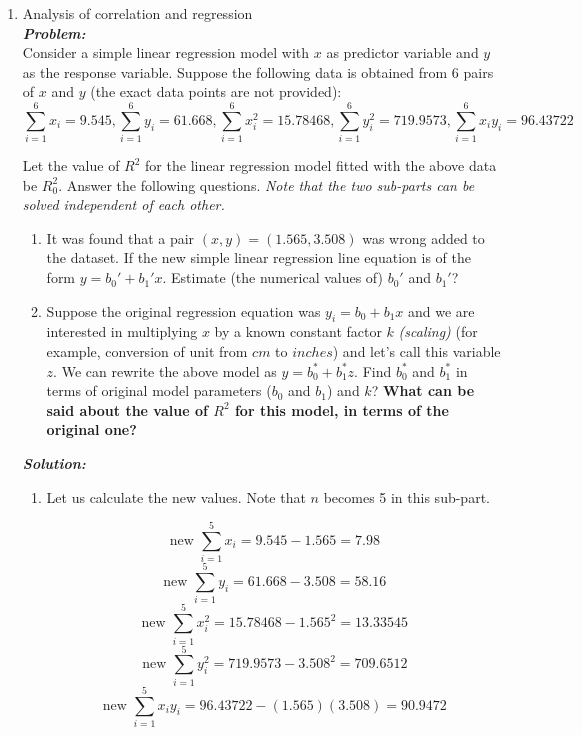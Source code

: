 \documentclass[12pt, oneside]{article}
\begin{document}
\begin{enumerate}
\begin{enumerate}
\end{enumerate}


\item	Analysis of correlation and regression  \\
\textit{\textbf{Problem:}} \\

Consider a simple linear regression model with $x$ as predictor variable and $y$ as the response variable. Suppose the following data is obtained from 6 pairs of $x$ and $y$ (the exact data points are not provided):
\[ \sum_{i=1}^{6} x_i = 9.545,
\sum_{i=1}^{6} y_i = 61.668,
\sum_{i=1}^{6} x_i^2 = 15.78468,
\sum_{i=1}^{6} y_i^2 = 719.9573,
\sum_{i=1}^{6} x_i y_i = 96.43722
\]

Let the value of $R^2$ for the linear regression model fitted with the above data be $R_0^2$. Answer the following questions. \textit{Note that the two sub-parts can be solved independent of each other.}

\begin{enumerate}
    \item It was found that a pair $(x,y) = (1.565,3.508)$ was wrong added to the dataset. If the new simple linear regression line equation is of the form $y = b_0' + b_1' x$. Estimate (the numerical values of) $b_0'$ and $b_1'$?
    
    \item Suppose the original regression equation was $y_i = b_0 + b_1x$ and we are interested in multiplying $x$ by a known constant factor $k$ \textit{(scaling)} (for example, conversion of unit from $cm$ to $inches$) and let's call this variable $z$. We can rewrite the above model as $y = b_0^* + b_1^*z$. Find $b_0^*$ and $b_1^*$ in terms of original model parameters ($b_0$ and $b_1$) and $k$? \textbf{What can be said about the value of $R^2$ for this model, in terms of the original one?}
\end{enumerate}

\textit{\textbf{Solution:}} \\

\begin{enumerate}
\item 
Let us calculate the new values. Note that $n$ becomes 5 in this sub-part.

\[ \text{new }  \sum_{i=1}^{5} x_i = 9.545 - 1.565 = 7.98 \]
\[ \text{new } \sum_{i=1}^{5} y_i = 61.668 - 3.508 = 58.16  \]
\[ \text{new } \sum_{i=1}^{5} x_i^2 = 15.78468 - 1.565^2 = 13.33545  \]
\[ \text{new } \sum_{i=1}^{5} y_i^2 = 719.9573 - 3.508^2 = 709.6512 \]
\[ \text{new } \sum_{i=1}^{5} x_i y_i = 96.43722 - (1.565)(3.508) = 90.9472\]


\end{enumerate}
\end{enumerate}
\end{document}
